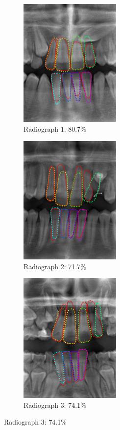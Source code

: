 \documentclass[a4paper,10pt]{article}
\begin{document}
\begin{figure}
\captionsetup[subfigure]{labelformat=empty}
\begin{subfigure}{.33\textwidth}
\centering
\includegraphics[width=50mm]{tooth_result_overlay_1.png}
\caption{Radiograph 1: 80.7\%}
\end{subfigure}%
\begin{subfigure}{.33\textwidth}
\centering
\includegraphics[width=50mm]{tooth_result_overlay_2.png}
\caption{Radiograph 2: 71.7\%}
\end{subfigure}%
\begin{subfigure}{.33\textwidth}
\centering
\includegraphics[width=50mm]{tooth_result_overlay_3.png}
\caption{Radiograph 3: 74.1\%}
\end{subfigure}%


\end{figure}
\end{document}
